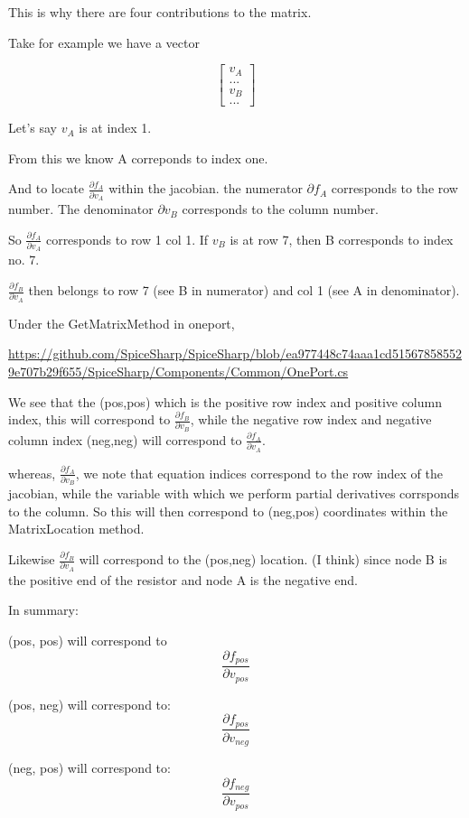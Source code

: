 \documentclass[12pt]{article}
\renewcommand{\_}{\kern-1.5pt\textunderscore\kern-1.5pt}
\begin{document}
This is why there are four contributions to the matrix. 

Take for example we have a vector

$$
\begin{bmatrix}
v_A \\
... \\
v_B \\
...
\end{bmatrix}
$$

Let's say $v_A$ is at index 1.

From this we know A correponds to index one.

And to locate $\frac{\partial f_A}{\partial v_A}$ within the jacobian. the numerator $\partial f_A$ corresponds to the row number. The denominator $\partial v_B$ corresponds to the column number.

So $\frac{\partial f_A}{\partial v_A}$ corresponds to row 1 col 1. If $v_B$ is at row 7, then B corresponds to index no. 7.

$\frac{\partial f_B}{\partial v_A}$ then belongs to row 7 (see B in numerator) and col 1 (see A in denominator).

Under the GetMatrixMethod in oneport,

\url{https://github.com/SpiceSharp/SpiceSharp/blob/ea977448c74aaa1cd515678585529e707b29f655/SpiceSharp/Components/Common/OnePort.cs}

We see that the (pos,pos) which is the positive row index and positive column index, this will correspond to $\frac{\partial f_B}{\partial v_B}$, while the negative row index and negative column index (neg,neg) will correspond to $\frac{\partial f_A}{\partial v_A}$.

whereas, $\frac{\partial f_A}{\partial v_B}$, we note that equation indices correspond to the row index of the jacobian, while the variable with which we perform partial derivatives corrsponds to the column. So this will then correspond to (neg,pos) coordinates within the MatrixLocation method.

Likewise $\frac{\partial f_B}{\partial v_A}$ will correspond to the (pos,neg) location. (I think) since node B is the positive end of the resistor and node A is the negative end. 

In summary:

(pos, pos) will correspond to
$$\frac{\partial f_{pos}}{\partial v_{pos}}$$

(pos, neg) will correspond to:
$$\frac{\partial f_{pos}}{\partial v_{neg}}$$

(neg, pos) will correspond to:
$$\frac{\partial f_{neg}}{\partial v_{pos}}$$
\end{document}
